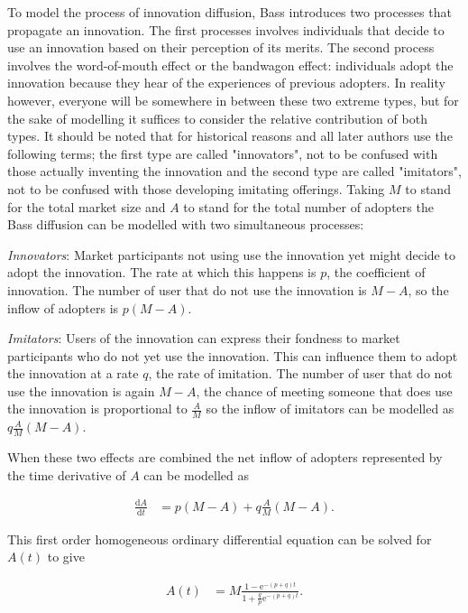 \documentclass[smallextended,final]{svjour3}
\newcommand{\nd}[2]{\frac{\mathrm{d} #1}{\mathrm{d} #2}}
\newcommand{\e}{\mathrm{e}}
\begin{document}
To model the process of innovation diffusion, Bass \citep{bass69} introduces two processes that propagate an innovation. The first processes involves individuals that decide to use an innovation based on their perception of its merits. The second process involves the word-of-mouth effect or the bandwagon effect: individuals adopt the innovation because they hear of the experiences of previous adopters. In reality however, everyone will be somewhere in between these two extreme types, but for the sake of modelling it suffices to consider the relative contribution of both types. It should be noted that for historical reasons \citet{bass69} and all later authors use the following terms; the first type are called "innovators", not to be confused with those actually inventing the innovation and the second type are called "imitators", not to be confused with those developing imitating offerings. Taking $M$ to stand for the total market size and $A$ to stand for the total number of adopters the Bass diffusion can be modelled with two simultaneous processes:

\emph{Innovators}: Market participants not using use the innovation yet might decide to adopt the innovation. The rate at which this happens is $p$, the coefficient of innovation. The number of user that do not use the innovation is $M-A$, so the inflow of adopters is $p(M-A)$.

\emph{Imitators}: Users of the innovation can express their fondness to market participants who do not yet use the innovation. This can influence them to adopt the innovation at a rate $q$, the rate of imitation. The number of user that do not use the innovation is again $M-A$, the chance of meeting someone that does use the innovation is proportional to $\frac{A}{M}$ so the inflow of imitators can be modelled as $q\frac{A}{M}(M-A)$.

When these two effects are combined the net inflow of adopters represented by the time derivative of $A$ can be modelled as

\begin{align}
	\nd{A}{t} &= p (M-A) + q\frac{A}{M}(M-A) \text{.}
\end{align}

This first order homogeneous ordinary differential equation can be solved for $A(t)$ to give

\begin{align} \label{eq:bass}
	A(t) &= M \frac{1 - \e^{-(p+q)t}}{1 + \frac{q}{p} \e^{-(p+q)t}} \text{.}
\end{align}
\end{document}
